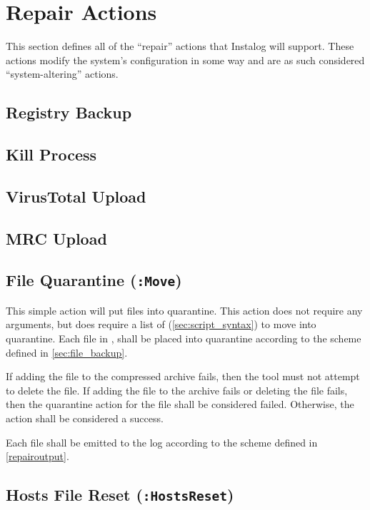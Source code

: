 \section{Repair Actions} \label{sec:repair_actions}
This section defines all of the ``repair'' actions that Instalog will support. 
These actions modify the system's configuration in some way and are as such
considered ``system-altering'' actions. \label{systemaltering}

\subsection{Registry Backup}

\subsection{Kill Process}

\subsection{VirusTotal Upload}

\subsection{MRC Upload}

\subsection{File Quarantine (\texttt{:Move})}
This simple action will put files into quarantine.  This action does not require
any arguments, but does require a list of  (\ref{sec:script_syntax})
to move into quarantine.  Each file in , shall be placed into
quarantine according to the scheme defined in \ref{sec:file_backup}.

If adding the file to the compressed archive fails, then the tool must not
attempt to delete the file.  If adding the file to the archive fails or deleting
the file fails, then the quarantine action for the file shall be considered
failed.  Otherwise, the action shall be considered a success.  

Each file shall be emitted to the log according to the scheme defined in
\ref{repairoutput}.

\subsection{Hosts File Reset (\texttt{:HostsReset})}

